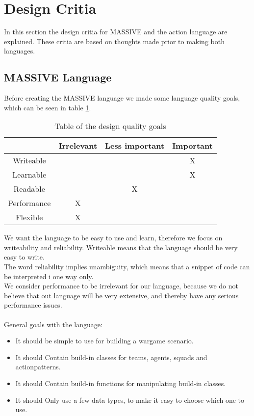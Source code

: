 \section{Design Critia}
\label{sec:designcrit}
In this section the design critia for MASSIVE and the action language are explained. These critia are based on thoughts made prior to making both languages.

\subsection{MASSIVE Language}
Before creating the MASSIVE language we made some language quality goals, which can be seen in table \ref{table:priorities}.

\begin{table}[ht]
\caption{Table of the design quality goals} %
\centering %
\begin{tabular}{cccc} %
\hline\hline %
 & Irrelevant & Less important & Important \\ [0.5ex] %
\hline %
Writeable &  &  & X\\ %
Learnable &  &  & X\\
Readable &  & X & \\
Performance & X &  & \\
Flexible & X &  & \\ [1ex] %
\hline %
\end{tabular} 
\label{table:priorities} %
\end{table}

We want the language to be easy to use and learn, therefore we focus on writeability and reliability. Writeable means that the language should be very easy to write.\\
The word reliability implies unambiguity, which means that a snippet of code can be interpreted i one way only.\\ \indent
We consider performance to be irrelevant for our language, because we do not believe that out language will be very extensive, and thereby have any serious performance issues.\\ \\
General goals with the language:

\begin{itemize}
	\item It should be simple to use for building a wargame scenario.
	\item It should Contain build-in classes for teams, agents, squads and actionpatterns.
	\item It should Contain build-in functions for manipulating build-in classes.
	\item It should Only use a few data types, to make it easy to choose which one to use.
\end{itemize}

